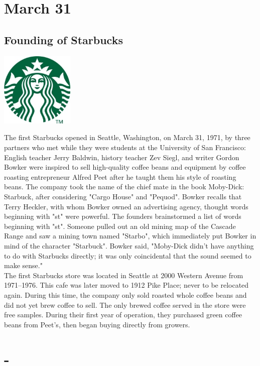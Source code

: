 \documentclass[11pt]{report}
\begin{document}
\section{March 31}
\subsection{Founding of Starbucks}
\vspace{2mm}\begin{center}\includegraphics[width=3.5cm]{./img/starbucksLogo.jpg}\end{center}
The first Starbucks opened in Seattle, Washington, on March 31, 1971, by three partners who met while they were students at the University of San Francisco: English teacher Jerry Baldwin, history teacher Zev Siegl, and writer Gordon Bowker were inspired to sell high-quality coffee beans and equipment by coffee roasting entrepreneur Alfred Peet after he taught them his style of roasting beans. The company took the name of the chief mate in the book Moby-Dick: Starbuck, after considering "Cargo House" and "Pequod". Bowker recalls that Terry Heckler, with whom Bowker owned an advertising agency, thought words beginning with "st" were powerful. The founders brainstormed a list of words beginning with "st". Someone pulled out an old mining map of the Cascade Range and saw a mining town named "Starbo", which immediately put Bowker in mind of the character "Starbuck". Bowker said, "Moby-Dick didn't have anything to do with Starbucks directly; it was only coincidental that the sound seemed to make sense."\\ \indent The first Starbucks store was located in Seattle at 2000 Western Avenue from 1971–1976. This cafe was later moved to 1912 Pike Place; never to be relocated again. During this time, the company only sold roasted whole coffee beans and did not yet brew coffee to sell. The only brewed coffee served in the store were free samples. During their first year of operation, they purchased green coffee beans from Peet's, then began buying directly from growers.
\section{-}
\end{document}
